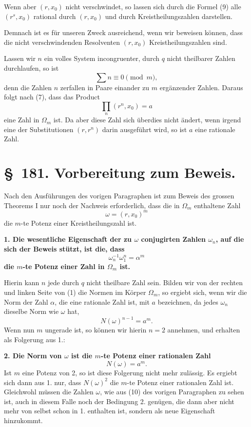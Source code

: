 \documentclass[11pt]{article}
\begin{document}
Wenn aber $(r,x_0)$ nicht verschwindet, so lassen sich durch die Formel (9) alle $(r^s,x_0)$ rational durch $(r,x_0)$ und durch Kreistheilungszahlen darstellen.

Demnach ist es für unseren Zweck ausreichend, wenn wir beweisen können, dass die nicht verschwindenden Resolventen $(r,x_0)$ Kreistheilungszahlen sind.

Lassen wir $n$ ein volles System incongruenter, durch $q$ nicht theilbarer Zahlen durchlaufen, so ist
\[
  \sum n\equiv0\pmod m,
\]
denn die Zahlen $n$ zerfallen in Paare einander zu $m$ ergänzender Zahlen. Daraus folgt nach (7), dass das Product
\begin{equation}
  \prod_n (r^n,x_0)=a
\tag{10}
\end{equation}
eine Zahl in $\Omega_m$ ist. Da aber diese Zahl sich überdies nicht ändert, wenn irgend eine der Substitutionen $(r,r^n)$ darin ausgeführt wird, so ist $a$ eine rationale Zahl.

\section*{\S~181. Vorbereitung zum Beweis.}

Nach den Ausführungen des vorigen Paragraphen ist zum Beweis des grossen Theorems I nur noch der Nachweis erforderlich, dass die in $\Omega_m$ enthaltene Zahl
\[
  \omega=(r,x_0)^m
\]
die $m$-te Potenz einer Kreistheilungszahl ist.

\textbf{1. Die wesentliche Eigenschaft der zu $\omega$ conjugirten Zahlen $\omega_n$, auf die sich der Beweis stützt, ist die, dass}
\begin{equation}
  \omega_n^{-1}\omega_1^n=\alpha^m
\tag{1}
\end{equation}
\textbf{die $m$-te Potenz einer Zahl in $\Omega_m$ ist.}

Hierin kann $n$ jede durch $q$ nicht theilbare Zahl sein. Bilden wir von der rechten und linken Seite von (1) die Normen im Körper $\Omega_m$, so ergiebt sich, wenn wir die Norm der Zahl $\alpha$, die eine rationale Zahl ist, mit $a$ bezeichnen, da jedes $\omega_n$ dieselbe Norm wie $\omega$ hat,
\[
  N(\omega)^{n-1}=a^m.
\]
Wenn nun $m$ ungerade ist, so können wir hierin $n=2$ annehmen, und erhalten als Folgerung aus 1.:

\textbf{2. Die Norm von $\omega$ ist die $m$-te Potenz einer rationalen Zahl}
\begin{equation}
  N(\omega)=a^m.
\tag{2}
\end{equation}
Ist $m$ eine Potenz von 2, so ist diese Folgerung nicht mehr zulässig. Es ergiebt sich dann aus 1. nur, dass $N(\omega)^2$ die $m$-te Potenz einer rationalen Zahl ist. Gleichwohl müssen die Zahlen $\omega$, wie aus (10) des vorigen Paragraphen zu sehen ist, auch in diesem Falle noch der Bedingung 2. genügen, die dann aber nicht mehr von selbst schon in 1. enthalten ist, sondern als neue Eigenschaft hinzukommt.
\end{document}
